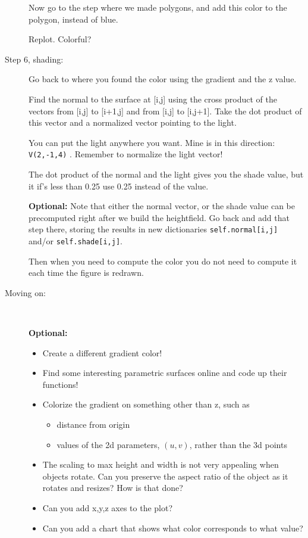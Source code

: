 \documentclass[12pt]{article}
\begin{document}
\begin{description}
Now go to the step where we made polygons, and 
add this color to the polygon, instead of blue.

Replot. Colorful?

\item[Step 6, shading:] Go back to where you
found the color using the gradient and the z value.

Find the normal to the surface at [i,j] using the cross
product of the vectors from [i,j] to [i+1,j] and from [i,j] to [i,j+1].
Take the dot product of this vector
and a normalized vector pointing to the light.

You can put the light anywhere you want.  Mine is in
this direction: \lstinline{V(2,-1,4)} .  Remember to normalize
the light vector!

The dot product of the normal and the light gives you the shade value,
but it if's less than 0.25 use 0.25 instead of the value.  

{\bf Optional:}
Note that either the normal vector, or the shade value can
be precomputed right after we build the heightfield.  Go back
and add that step there, storing the results in new dictionaries
\lstinline{self.normal[i,j]} and/or \lstinline{self.shade[i,j]}.

Then when you need to compute the color you do not need to
compute it each time the figure is redrawn.


\item[Moving on:]~

{\bf Optional:}
\begin{itemize}
\item Create a different gradient color!
\item Find some interesting parametric surfaces online and
code up their functions!
\item Colorize the gradient on something other than z, such as
\begin{itemize}
\item distance from origin
\item values of the 2d parameters, $(u,v)$, rather than the 3d points
\end{itemize}
\item The scaling to max height and width is not
very appealing when objects rotate.  Can you preserve the aspect ratio
of the object as it rotates and resizes?  How is that done?
\item Can you add x,y,z axes to the plot?
\item Can you add a chart that shows what color corresponds
to what value?
\end{itemize}

\end{description}
\end{document}
